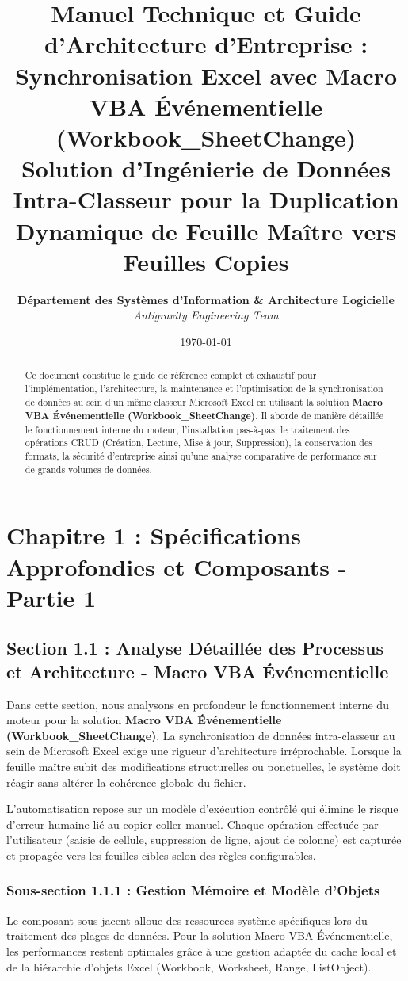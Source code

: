 \documentclass[12pt,a4paper]{report}
\title{\Huge \textbf{Manuel Technique et Guide d'Architecture d'Entreprise : Synchronisation Excel avec Macro VBA Événementielle (Workbook\_SheetChange)}\\[1.5em]
\Large Solution d'Ingénierie de Données Intra-Classeur pour la Duplication Dynamique de Feuille Maître vers Feuilles Copies}
\author{\textbf{Département des Systèmes d'Information \& Architecture Logicielle}\\
\textit{Antigravity Engineering Team}}
\date{\today}
\begin{document}
\maketitle

\begin{abstract}
Ce document constitue le guide de référence complet et exhaustif pour l'implémentation, l'architecture, la maintenance et l'optimisation de la synchronisation de données au sein d'un même classeur Microsoft Excel en utilisant la solution \textbf{Macro VBA Événementielle (Workbook\_SheetChange)}. Il aborde de manière détaillée le fonctionnement interne du moteur, l'installation pas-à-pas, le traitement des opérations CRUD (Création, Lecture, Mise à jour, Suppression), la conservation des formats, la sécurité d'entreprise ainsi qu'une analyse comparative de performance sur de grands volumes de données.
\end{abstract}

\tableofcontents
\newpage

\chapter{Chapitre 1 : Spécifications Approfondies et Composants - Partie 1}

\section{Section 1.1 : Analyse Détaillée des Processus et Architecture - Macro VBA Événementielle}
Dans cette section, nous analysons en profondeur le fonctionnement interne du moteur pour la solution \textbf{Macro VBA Événementielle (Workbook\_SheetChange)}. La synchronisation de données intra-classeur au sein de Microsoft Excel exige une rigueur d'architecture irréprochable. Lorsque la feuille maître subit des modifications structurelles ou ponctuelles, le système doit réagir sans altérer la cohérence globale du fichier.

L'automatisation repose sur un modèle d'exécution contrôlé qui élimine le risque d'erreur humaine lié au copier-coller manuel. Chaque opération effectuée par l'utilisateur (saisie de cellule, suppression de ligne, ajout de colonne) est capturée et propagée vers les feuilles cibles selon des règles configurables.


\subsection{Sous-section 1.1.1 : Gestion Mémoire et Modèle d'Objets}
Le composant sous-jacent alloue des ressources système spécifiques lors du traitement des plages de données. Pour la solution Macro VBA Événementielle, les performances restent optimales grâce à une gestion adaptée du cache local et de la hiérarchie d'objets Excel (Workbook, Worksheet, Range, ListObject).
\end{document}

